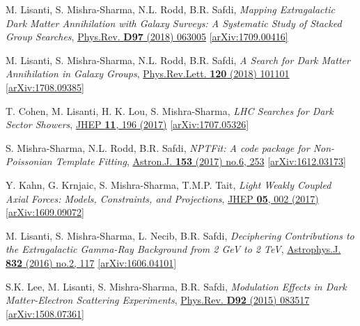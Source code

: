 \documentclass[11pt]{article}
\newenvironment{packed_enumerate}{
\begin{etaremune}
  \setlength{\itemsep}{3pt}
  \setlength{\parskip}{0pt}
  \setlength{\parsep}{0pt}}{\end{etaremune}
}
\begin{document}
\begin{packed_enumerate}
\item M. Lisanti, S. Mishra-Sharma, N.L. Rodd, B.R. Safdi, \emph{Mapping Extragalactic Dark Matter Annihilation with Galaxy Surveys: A Systematic Study of Stacked Group Searches},  \href{https://journals.aps.org/prd/abstract/10.1103/PhysRevD.97.063005}{Phys.Rev. \textbf{D97} (2018) 063005} \href{https://arxiv.org/abs/1709.00416}{[arXiv:1709.00416]}

\item M. Lisanti, S. Mishra-Sharma, N.L. Rodd, B.R. Safdi, \emph{A Search for Dark Matter Annihilation in Galaxy Groups},  \href{https://journals.aps.org/prl/abstract/10.1103/PhysRevLett.120.101101}{Phys.Rev.Lett. \textbf{120} (2018) 101101} \href{https://arxiv.org/abs/1708.09385}{[arXiv:1708.09385]}

\item T. Cohen, M. Lisanti, H. K. Lou, S. Mishra-Sharma, \emph{LHC Searches for Dark Sector Showers},  \href{https://link.springer.com/article/10.1007/JHEP11(2017)196}{JHEP \textbf{11}, 196 (2017)}  \href{https://arxiv.org/abs/1707.05326}{ [arXiv:1707.05326]}


\item S. Mishra-Sharma, N.L. Rodd, B.R. Safdi, \emph{NPTFit: A code package for Non-Poissonian Template Fitting},  \href{http://iopscience.iop.org/article/10.3847/1538-3881/aa6d5f/meta}{Astron.J. \textbf{153} (2017) no.6, 253}  \href{https://arxiv.org/abs/1612.03173}{ [arXiv:1612.03173]}

\item Y. Kahn, G. Krnjaic, S. Mishra-Sharma, T.M.P. Tait, \emph{Light Weakly Coupled Axial Forces: Models, Constraints, and Projections},  \href{https://link.springer.com/article/10.1007%2FJHEP05%282017%29002}{JHEP \textbf{05}, 002 (2017)}  \href{https://arxiv.org/abs/1609.09072}{[arXiv:1609.09072]}

\item M. Lisanti, S. Mishra-Sharma, L. Necib, B.R. Safdi, \emph{Deciphering Contributions to the Extragalactic Gamma-Ray Background from 2 GeV to 2 TeV},  \href{http://iopscience.iop.org/article/10.3847/0004-637X/832/2/117/meta}{Astrophys.J. \textbf{832} (2016) no.2, 117} \href{https://arxiv.org/abs/1606.04101}{[arXiv:1606.04101]}

\item S.K. Lee, M. Lisanti, S. Mishra-Sharma, B.R. Safdi, \emph{Modulation Effects in Dark Matter-Electron Scattering Experiments}, \href{https://journals.aps.org/prd/abstract/10.1103/PhysRevD.92.083517}{Phys.Rev. \textbf{D92} (2015) 083517} \href{https://arxiv.org/abs/1508.07361}{[arXiv:1508.07361]}

\end{packed_enumerate}
\end{document}
